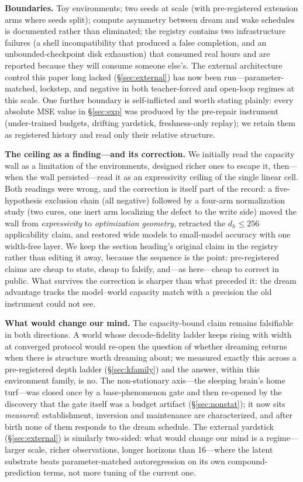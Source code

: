 \documentclass[11pt,a4paper]{article}
\begin{document}
\textbf{Boundaries.} Toy environments; two seeds at scale (with pre-registered extension arms where seeds split); compute asymmetry between dream and wake schedules is documented rather than eliminated; the registry contains two infrastructure failures (a shell incompatibility that produced a false completion, and an unbounded-checkpoint disk exhaustion) that consumed real hours and are reported because they will consume someone else's. The external architecture control this paper long lacked (\S\ref{sec:external}) has now been run---parameter-matched, lockstep, and negative in both teacher-forced and open-loop regimes at this scale. One further boundary is self-inflicted and worth stating plainly: every absolute MSE value in \S\ref{sec:exp} was produced by the pre-repair instrument (under-trained budgets, drifting yardstick, freshness-only replay); we retain them as registered history and read only their relative structure.

\textbf{The ceiling as a finding---and its correction.} We initially read the capacity wall as a limitation of the environments, designed richer ones to escape it, then---when the wall persisted---read it as an expressivity ceiling of the single linear cell. Both readings were wrong, and the correction is itself part of the record: a five-hypothesis exclusion chain (all negative) followed by a four-arm normalization study (two cures, one inert arm localizing the defect to the write side) moved the wall from \emph{expressivity} to \emph{optimization geometry}, retracted the $d_h \le 256$ applicability claim, and restored wide models to small-model accuracy with one width-free layer. We keep the section heading's original claim in the registry rather than editing it away, because the sequence is the point: pre-registered claims are cheap to state, cheap to falsify, and---as here---cheap to correct in public. What survives the correction is sharper than what preceded it: the dream advantage tracks the model--world capacity match with a precision the old instrument could not see.

\textbf{What would change our mind.} The capacity-bound claim remains falsifiable in both directions. A world whose decode-fidelity ladder keeps rising with width at converged protocol would re-open the question of whether dreaming returns when there is structure worth dreaming about; we measured exactly this across a pre-registered depth ladder (\S\ref{sec:kfamily}) and the answer, within this environment family, is no. The non-stationary axis---the sleeping brain's home turf---was closed once by a base-phenomenon gate and then re-opened by the discovery that the gate itself was a budget artifact (\S\ref{sec:nonstat}); it now sits \emph{measured}: establishment, inversion and maintenance are characterized, and after birth none of them responds to the dream schedule. The external yardstick (\S\ref{sec:external}) is similarly two-sided: what would change our mind is a regime---larger scale, richer observations, longer horizons than 16---where the latent substrate beats parameter-matched autoregression on its own compound-prediction terms, not more tuning of the current one.
\end{document}
